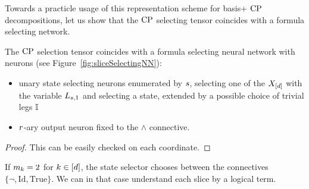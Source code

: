 Towards a practicle usage of this representation scheme for basis+ $\mathrm{CP}$ decompositions, let us show that the $\mathrm{CP}$ selecting tensor coincides with a formula selecting network.

\begin{lemma}
    \label{lem:fsnnRepresentingSliceSelector}
    The $\mathrm{CP}$ selection tensor coincides with a formula selecting neural network with neurons (see Figure~\ref{fig:sliceSelectingNN}):
    \begin{itemize}
        \item unary state selecting neurons enumerated by $s$, selecting one of the $X_{[d]}$ with the variable $L_{s,1}$ and selecting a state, extended by a possible choice of trivial legs $\mathbb{I}$
        \item $r$-ary output neuron fixed to the $\land$ connective.
    \end{itemize}
\end{lemma}
\begin{proof}
    This can be easily checked on each coordinate.
\end{proof}

If $m_{k}=2$ for $k\in[d]$, the state selector chooses between the connectives $\{\lnot, \mathrm{Id}, \mathrm{True}\}$.
We can in that case understand each slice by a logical term.

